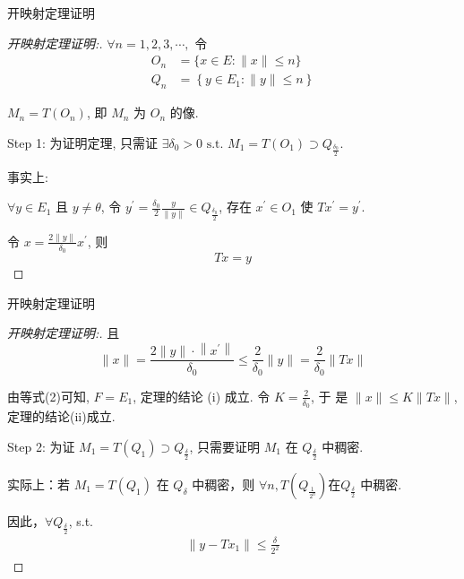 \documentclass[sans,mathserif]{beamer} %
\begin{document}
\begin{frame}{开映射定理证明}

\begin{proof}[开映射定理证明:]
$\forall n=1,2,3, \cdots,$  令
\begin{align*}
O_{n}&=\{x \in E:\|x\| \leq n\} \\
Q_{n}&=\left\{y \in E_{1}:\|y\| \leq n\right\}
\end{align*}

 $M_{n}=T\left(O_{n}\right)$, \quad  即  \quad $M_{n}$  为  $O_{n}$  的像.

 Step 1: 为证明定理, 只需证  $\exists \delta_{0}>0 \text { s.t. } M_{1}=T\left(O_{1}\right) \supset Q_{\frac{\delta_{0}}{2}}$.

 事实上:

$\forall y \in E_{1} \text { 且 } y \neq \theta$, 令 $ y^{\prime}=\frac{\delta_{0}}{2} \frac{y}{\|y\|} \in Q_{\frac{\delta_{0}}{2}}$,  存在  $x^{\prime} \in O_{1}$  使  $T x^{\prime}=y^{\prime}$.

令 $ x=\frac{2\|y\|}{\delta_{0}} x^{\prime}$,  则
\begin{equation}
T x=y	
\end{equation}

\end{proof}
\end{frame}


\begin{frame}{开映射定理证明}
	\begin{proof}[开映射定理证明:]
	且
\begin{equation}
	\|x\|=\frac{2\|y\| \cdot\left\|x^{\prime}\right\|}{\delta_{0}} \leq \frac{2}{\delta_{0}}\|y\|=\frac{2}{\delta_{0}}\|T x\|
\end{equation}

由等式(2)可知, $ F=E_{1}$, 定理的结论 (i) 成立.  令 $K=\frac{2}{\delta_{0}}$,  于 是  $\|x\| \leq K\|T x\|$,  定理的结论(ii)成立.

Step 2: 为证 $M_1=T(Q_{1})\supset Q_{\frac{\delta}{2}}$, 只需要证明 $M_{1}$ 在 $Q_{\frac{\delta}{2}}$ 中稠密.

实际上：若 $M_1=T(Q_{1})$ 在 $Q_{\delta}$ 中稠密，则 $\forall n, T(Q_{\frac{1}{2^n}}) 在 $$Q_{\frac{\delta}{2}}$ 中稠密.

因此，$\forall Q_{\frac{\delta}{2}}$, s.t.
\begin{align*}
\|y-Tx_{1}\|\leq \frac{\delta}{2^2}
\end{align*}
\end{proof}
\end{frame}
\end{document}
